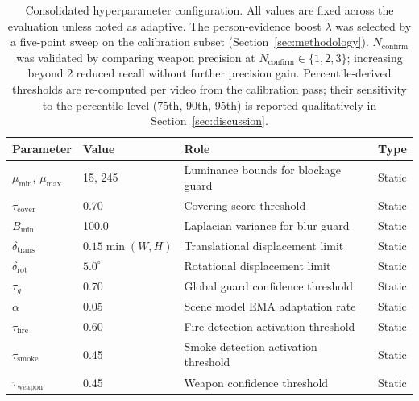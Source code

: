 \documentclass[a4paper,fleqn]{cas-dc}
\begin{document}
\begin{table}[!ht]
\caption[Consolidated hyperparameter configuration]{Consolidated hyperparameter configuration. All values are fixed across the evaluation unless noted as adaptive. The person-evidence boost $\lambda$ was selected by a five-point sweep on the calibration subset (Section~\ref{sec:methodology}). $N_{\text{confirm}}$ was validated by comparing weapon precision at $N_{\text{confirm}} \in \{1,2,3\}$; increasing beyond 2 reduced recall without further precision gain. Percentile-derived thresholds are re-computed per video from the calibration pass; their sensitivity to the percentile level (75th, 90th, 95th) is reported qualitatively in Section~\ref{sec:discussion}.}
\label{tab:method-hyper}
\label{tab:hyperparams}
\centering
\footnotesize
\setlength{\tabcolsep}{3pt}
\renewcommand{\arraystretch}{1.05}
\begin{tabularx}{\linewidth}{p{1.85cm} p{1.15cm} >{\raggedright\arraybackslash}X p{1.35cm}}
\toprule
\textbf{Parameter} & \textbf{Value} & \textbf{Role} & \textbf{Type} \\
\midrule
$\mu_{\min}$, $\mu_{\max}$          & 15, 245       & Luminance bounds for blockage guard           & Static \\
$\tau_{\text{cover}}$               & 0.70          & Covering score threshold                      & Static \\
$B_{\min}$                          & 100.0         & Laplacian variance for blur guard             & Static \\
$\delta_{\text{trans}}$             & $0.15\min(W,H)$ & Translational displacement limit            & Static \\
$\delta_{\text{rot}}$               & $5.0^\circ$   & Rotational displacement limit                 & Static \\
$\tau_g$                            & 0.70          & Global guard confidence threshold             & Static \\
$\alpha$                            & 0.05          & Scene model EMA adaptation rate               & Static \\
$\tau_{\text{fire}}$                & 0.60          & Fire detection activation threshold           & Static \\
$\tau_{\text{smoke}}$               & 0.45          & Smoke detection activation threshold          & Static \\
$\tau_{\text{weapon}}$              & 0.45          & Weapon confidence threshold                   & Static \\

\end{tabularx}
\end{table}
\end{document}
